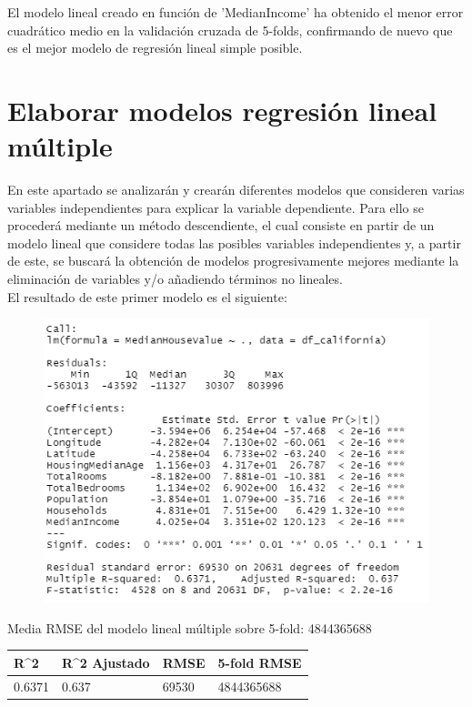 \vspace{0.5cm}
El modelo lineal creado en función de 'MedianIncome' ha obtenido el menor error cuadrático medio en la validación cruzada de 5-folds, confirmando de nuevo que es el mejor modelo de regresión lineal simple posible.




\newpage
\section{Elaborar modelos regresión lineal múltiple}
En este apartado se analizarán y crearán diferentes modelos que consideren varias variables independientes para explicar la variable dependiente. Para ello se procederá mediante un método descendiente, el cual consiste en partir de un modelo lineal que considere todas las posibles variables independientes y, a partir de este, se buscará la obtención de modelos progresivamente mejores mediante la eliminación de variables y/o añadiendo términos no lineales.\\

El resultado de este primer modelo es el siguiente:
\begin{figure}[!h]
	\centering
	\includegraphics[width=0.7\linewidth]{figures/fit_multi1}
	\caption{}
	\label{fig:fitmulti1}
\end{figure}

Media RMSE del modelo lineal múltiple sobre 5-fold: 4844365688
\vspace{0.5cm}
\begin{table}[!h]
	\centering
	\begin{tabular}{llll}
		R\textasciicircum{}2 & R\textasciicircum{}2 Ajustado & RMSE  & 5-fold RMSE \\ \hline
		0.6371               & 0.637                         & 69530 & 4844365688 
	\end{tabular}
\end{table}

